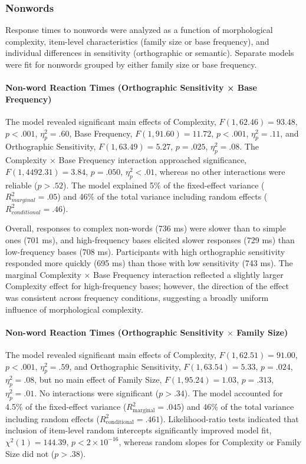 	\subsubsection{Nonwords}
	
		Response times to nonwords were analyzed as a function of morphological complexity, item-level characteristics (family size or base frequency), and individual differences in sensitivity (orthographic or semantic). Separate models were fit for nonwords grouped by either family size or base frequency.
	
		\paragraph{Non-word Reaction Times (Orthographic Sensitivity × Base Frequency)}
	
		The model revealed significant main effects of Complexity, $F(1,62.46)=93.48$, $p<.001$, $\eta^2_p=.60$, Base Frequency, $F(1,91.60)=11.72$, $p<.001$, $\eta^2_p=.11$, and Orthographic Sensitivity, $F(1,63.49)=5.27$, $p=.025$, $\eta^2_p=.08$. The Complexity × Base Frequency interaction approached significance, $F(1,4492.31)=3.84$, $p=.050$, $\eta^2_p<.01$, whereas no other interactions were reliable ($p>.52$). The model explained 5\% of the fixed-effect variance ($R^2_{marginal}=.05$) and 46\% of the total variance including random effects ($R^2_{conditional}=.46$).
	
		Overall, responses to complex non-words (736 ms) were slower than to simple ones (701 ms), and high-frequency bases elicited slower responses (729 ms) than low-frequency bases (708 ms). Participants with high orthographic sensitivity responded more quickly (695 ms) than those with low sensitivity (743 ms). The marginal Complexity × Base Frequency interaction  reflected a slightly larger Complexity effect for high-frequency bases; however, the direction of the effect was consistent across frequency conditions, suggesting a broadly uniform influence of morphological complexity.


		\paragraph{Non-word Reaction Times (Orthographic Sensitivity $\times$ Family Size)}
	
	The model revealed significant main effects of Complexity, $F(1, 62.51) = 91.00$, $p < .001$, $\eta^2_p = .59$, and Orthographic Sensitivity, $F(1, 63.54) = 5.33$, $p = .024$, $\eta^2_p = .08$, but no main effect of Family Size, $F(1, 95.24) = 1.03$, $p = .313$, $\eta^2_p = .01$. No interactions were significant ($p > .34$). The model accounted for 4.5\% of the fixed-effect variance ($R^2_{\text{marginal}} = .045$) and 46\% of the total variance including random effects ($R^2_{\text{conditional}} = .461$). Likelihood-ratio tests indicated that inclusion of item-level random intercepts significantly improved model fit, $\chi^2(1) = 144.39$, $p < 2 \times 10^{-16}$, whereas random slopes for Complexity or Family Size did not ($p > .38$).
	
